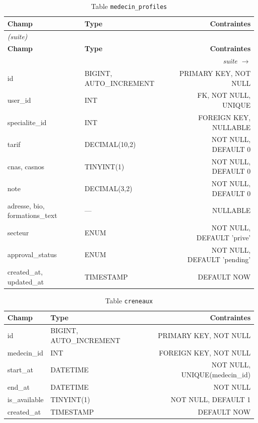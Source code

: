 \documentclass[12pt,a4paper]{report}
\newcommand{\tblheadershort}{%
  \hline
  \textbf{Champ} & \textbf{Type} & \textbf{Contraintes} \\
  \hline\hline
}
\newcommand{\longtblheadershort}{%
  \hline
  \textbf{Champ} & \textbf{Type} & \textbf{Contraintes} \\
  \hline\hline
  \endfirsthead
  \multicolumn{3}{l}{\small\textit{(suite)}} \\
  \hline
  \textbf{Champ} & \textbf{Type} & \textbf{Contraintes} \\
  \hline\hline
  \endhead
  \hline
  \multicolumn{3}{r|}{\small\textit{suite $\rightarrow$}} \\
  \endfoot
  \hline
  \endlastfoot
}
\begin{document}
\begin{longtable}{PQR}
  \caption{Table \texttt{medecin\_profiles}} \label{tab:medecin_profiles} \\
  \longtblheadershort
  id                           & BIGINT, AUTO\_INCREMENT & PRIMARY KEY, NOT NULL \\ \hline
  user\_id                     & INT                     & FK, NOT NULL, UNIQUE \\ \hline
  specialite\_id               & INT                     & FOREIGN KEY, NULLABLE \\ \hline
  tarif                        & DECIMAL(10,2)           & NOT NULL, DEFAULT 0 \\ \hline
  cnas, casnos                 & TINYINT(1)              & NOT NULL, DEFAULT 0 \\ \hline
  note                         & DECIMAL(3,2)            & NOT NULL, DEFAULT 0 \\ \hline
  adresse, bio, formations\_text & ---                   & NULLABLE \\ \hline
  secteur                      & ENUM                    & NOT NULL, DEFAULT 'prive' \\ \hline
  approval\_status             & ENUM                    & NOT NULL, DEFAULT 'pending' \\ \hline
  created\_at, updated\_at     & TIMESTAMP               & DEFAULT NOW \\ \hline
\end{longtable}

\begin{table}[H]
\centering
\caption{Table \texttt{creneaux}}
\begin{tabular}{PQR}
  \tblheadershort
  id            & BIGINT, AUTO\_INCREMENT & PRIMARY KEY, NOT NULL \\ \hline
  medecin\_id   & INT                     & FOREIGN KEY, NOT NULL \\ \hline
  start\_at     & DATETIME                & NOT NULL, UNIQUE(medecin\_id) \\ \hline
  end\_at       & DATETIME                & NOT NULL \\ \hline
  is\_available & TINYINT(1)              & NOT NULL, DEFAULT 1 \\ \hline
  created\_at   & TIMESTAMP               & DEFAULT NOW \\ \hline
\end{tabular}
\end{table}
\end{document}
